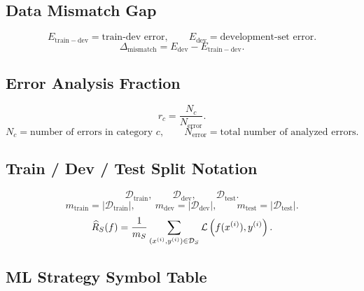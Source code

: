 \subsection{Data Mismatch Gap}

\[
E_{\mathrm{train-dev}}=\text{train-dev error},
\qquad
E_{\mathrm{dev}}=\text{development-set error}.
\]
\[
\Delta_{\mathrm{mismatch}}
=
E_{\mathrm{dev}}-E_{\mathrm{train-dev}}.
\]

\subsection{Error Analysis Fraction}

\[
r_c
=
\frac{N_c}{N_{\mathrm{error}}}.
\]
\[
N_c=\text{number of errors in category }c,
\qquad
N_{\mathrm{error}}=\text{total number of analyzed errors}.
\]

\subsection{Train / Dev / Test Split Notation}

\[
\mathcal{D}_{\mathrm{train}},
\qquad
\mathcal{D}_{\mathrm{dev}},
\qquad
\mathcal{D}_{\mathrm{test}}.
\]
\[
m_{\mathrm{train}}
=
\lvert \mathcal{D}_{\mathrm{train}}\rvert,
\qquad
m_{\mathrm{dev}}
=
\lvert \mathcal{D}_{\mathrm{dev}}\rvert,
\qquad
m_{\mathrm{test}}
=
\lvert \mathcal{D}_{\mathrm{test}}\rvert.
\]
\[
\widehat{R}_S(f)
=
\frac{1}{m_S}
\sum_{(x^{(i)},y^{(i)})\in \mathcal{D}_S}
\mathcal{L}
\left(
f(x^{(i)}),y^{(i)}
\right).
\]

\subsection{ML Strategy Symbol Table}

